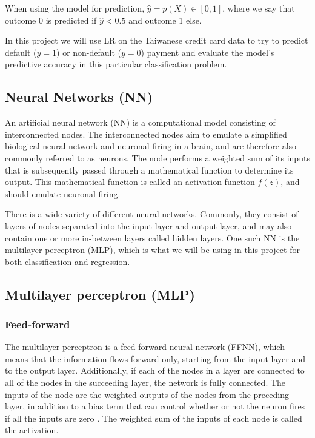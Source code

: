\documentclass[a4paper, 11pt, twocolumn]{article}
\begin{document}
When using the model for prediction, $\hat{y}=p(X)\in [0, 1]$, where we say
that outcome 0 is predicted if $\hat{y}< 0.5$ and outcome 1 else.

In this project we will use LR on the Taiwanese credit card data to try to predict
default ($y=1$) or non-default ($y=0$) payment and evaluate the model's predictive
accuracy in this particular classification problem.

\subsection{Neural Networks (NN)}

An artificial neural network (NN) is a computational model consisting of
interconnected nodes. The interconnected nodes aim to emulate a simplified
biological neural network and neuronal firing in a brain, and are therefore
also commonly referred to as neurons.  The node performs a weighted sum of its
inputs that is subsequently passed through a mathematical function to determine
its output. This mathematical function is called an activation function $f(z)$,
and should emulate neuronal firing.

There is a wide variety of different neural networks. Commonly, they consist of
layers of nodes separated into the input layer and output layer, and may also
contain one or more in-between layers called hidden layers. One such NN is the
multilayer perceptron (MLP), which is what we will be using in this project for
both classification and regression.
\subsection{Multilayer perceptron (MLP)}

\subsubsection{Feed-forward  }
The multilayer perceptron is a feed-forward neural network (FFNN), which means
that the information flows forward only, starting from the input layer and to
the output layer. Additionally, if each of the nodes in a layer are connected to
all of the nodes in the succeeding layer, the network is fully connected. The
inputs of the node are the weighted outputs of the nodes from the preceding
layer, in addition to a bias term that can control whether or not the neuron
fires if all the inputs are zero \cite{ML_algo}. The weighted sum of the inputs
of each node is called the activation.
\end{document}
